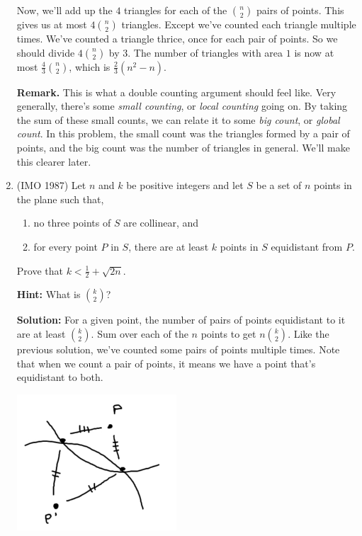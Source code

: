 \documentclass[11pt,paper=letter]{scrartcl}
\begin{document}
\begin{enumerate}
Now, we'll add up the $4$ triangles for each of the $\binom{n}{2}$ pairs of points. This gives us at most $4\binom{n}{2}$ triangles. Except we've counted each triangle multiple times. We've counted a triangle thrice, once for each pair of points. So we should divide $4\binom{n}{2}$ by $3$. The number of triangles with area $1$ is now at most $\frac{4}{3}\binom{n}{2}$, which is $\frac{2}{3}(n^2 - n)$.

\textbf{Remark.} This is what a double counting argument should feel like. Very generally, there's some \textit{small counting}, or \textit{local counting} going on. By taking the sum of these small counts, we can relate it to some \textit{big count}, or \textit{global count}. In this problem, the small count was the triangles formed by a pair of points, and the big count was the number of triangles in general. We'll make this clearer later.

\item (IMO 1987) Let $n$ and $k$ be positive integers and let $S$ be a set of $n$ points in the plane such that,
\begin{enumerate}
  \item no three points of $S$ are collinear, and
  \item for every point $P$ in $S$, there are at least $k$ points in $S$ equidistant from $P$.
\end{enumerate}
Prove that $k < \frac{1}{2} + \sqrt{2n}$.

\textbf{Hint:} What is $\binom{k}{2}$?

\textbf{Solution:} For a given point, the number of pairs of points equidistant to it are at least $\binom{k}{2}$. Sum over each of the $n$ points to get $n\binom{k}{2}$. Like the previous solution, we've counted some pairs of points multiple times. Note that when we count a pair of points, it means we have a point that's equidistant to both.

\begin{center}
  \includegraphics[height=2in]{199.jpg}
\end{center}


\end{enumerate}
\end{document}
